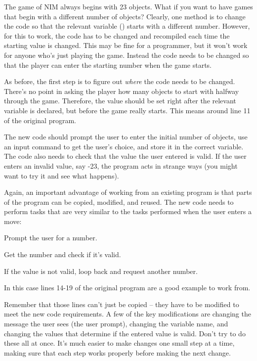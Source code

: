 
The game of NIM always begins with 23 objects.   What if you want to have games that begin with a different number of objects?    Clearly, one method is to change the code so that the relevant variable () starts with a different number.  However, for this to work, the code has to be changed and recompiled each time the starting value is changed.  This may be fine for a programmer, but it won't work for anyone who's just playing the game.  
Instead the code needs to be changed so that the player can enter the starting number when the game starts. 

As before, the first step is to figure out \emph{where} the code needs to be changed.  There's no point in asking the player how many objects to start with halfway through the game.  Therefore, the value should be set right after the relevant variable  is declared, but before the game really starts.  This means around line 11 of the original program.  

The new code should prompt the user to enter the initial number of objects, use an input command to get the user's choice, and store it in the correct variable.  The code also needs to check that the value the user entered is valid.  If the user enters an invalid value, say -23, the program acts in strange ways (you might want to try it and see what happens).

Again, an important advantage of working from an existing program is that parts of the program can be copied, modified, and reused.  The new code needs to perform tasks that are very similar to the tasks performed when the user enters a move: 
\begin{tight_enumerate}
\item Prompt the user for a number.
\item Get the number and check if it's valid. 
\item If the value is not valid, loop back and request another number.  
\end{tight_enumerate}
In this case lines 14-19 of the original program are a good example to work from.  

Remember that those lines can't just be copied -- they have to be modified to meet the new code requirements.  A few of the key modifications are changing the message the user sees (the user prompt), changing the variable name, and changing the values that determine if the entered value is valid.  Don't try to do these all at once.  It's much easier to make changes one small step at a time, making sure that each step works properly before making the next change.

